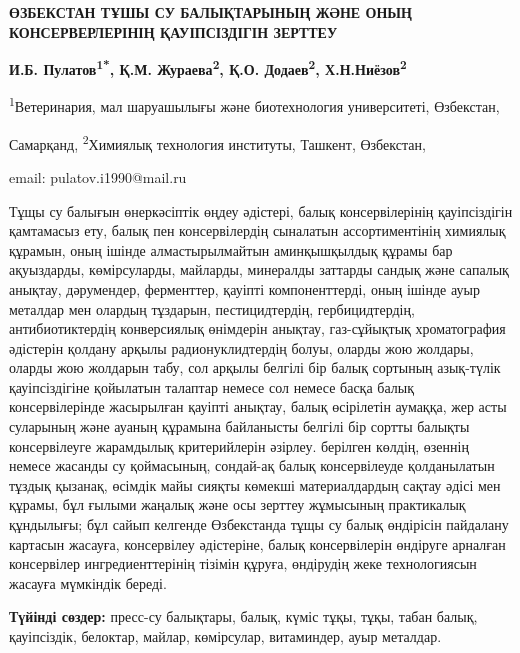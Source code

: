 \begin{center}
{\large\bfseries ӨЗБЕКСТАН ТҰШЫ СУ БАЛЫҚТАРЫНЫҢ ЖӘНЕ ОНЫҢ КОНСЕРВЕРЛЕРІНІҢ
ҚАУІПСІЗДІГІН ЗЕРТТЕУ}

\vspace{1em}
{\bfseries И.Б. Пулатов\textsuperscript{1*}, Қ.М.
Жураева\textsuperscript{2}, Қ.О. Додаев\textsuperscript{2},
Х.Н.Ниёзов\textsuperscript{2}}

\textsuperscript{1}Ветеринария, мал шаруашылығы және биотехнология
университеті, Өзбекстан,

Самарқанд, \textsuperscript{2}Химиялық технология институты, Ташкент,
Өзбекстан,

email: pulatov.i1990@mail.ru
\end{center}

\hspace{1.5em} Тұщы су балығын өнеркәсіптік өңдеу әдістері, балық консервілерінің
қауіпсіздігін қамтамасыз ету, балық пен консервілердің сыналатын
ассортиментінің химиялық құрамын, оның ішінде алмастырылмайтын
аминқышқылдық құрамы бар ақуыздарды, көмірсуларды, майларды, минералды
заттарды сандық және сапалық анықтау, дәрумендер, ферменттер, қауіпті
компоненттерді, оның ішінде ауыр металдар мен олардың тұздарын,
пестицидтердің, гербицидтердің, антибиотиктердің конверсиялық өнімдерін
анықтау, газ-сұйықтық хроматография әдістерін қолдану арқылы
радионуклидтердің болуы, оларды жою жолдары, оларды жою жолдарын табу,
сол арқылы белгілі бір балық сортының азық-түлік қауіпсіздігіне
қойылатын талаптар немесе сол немесе басқа балық консервілерінде
жасырылған қауіпті анықтау, балық өсірілетін аумаққа, жер асты суларының
және ауаның құрамына байланысты белгілі бір сортты балықты консервілеуге
жарамдылық критерийлерін әзірлеу. берілген көлдің, өзеннің немесе
жасанды су қоймасының, сондай-ақ балық консервілеуде қолданылатын тұздық
қызанақ, өсімдік майы сияқты көмекші материалдардың сақтау әдісі мен
құрамы, бұл ғылыми жаңалық және осы зерттеу жұмысының практикалық
құндылығы; бұл сайып келгенде Өзбекстанда тұщы су балық өндірісін
пайдалану картасын жасауға, консервілеу әдістеріне, балық консервілерін
өндіруге арналған консервілер ингредиенттерінің тізімін құруға,
өндірудің жеке технологиясын жасауға мүмкіндік береді.

{\hspace{1.5em} \bfseries Түйінді сөздер:} пресс-су балықтары, балық, күміс тұқы, тұқы,
табан балық, қауіпсіздік, белоктар, майлар, көмірсулар, витаминдер, ауыр
металдар.

\pagebreak

